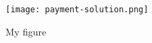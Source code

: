 
\begin{figure}[hbt!]
    \centering
    \texttt{[image: payment-solution.png]}
    \caption{My figure}
    \label{fig:my_figure}
\end{figure}
